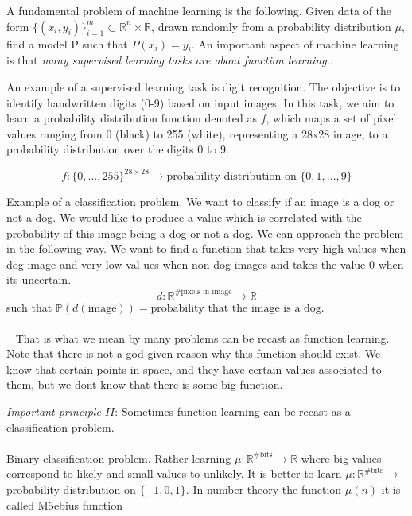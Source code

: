 \documentclass[../main.tex]{subfiles}
\begin{document}
	\noindent 
	A fundamental problem of machine learning is the following. Given data of the form $\{(x_i,y_i)\}^m_{i=1} \subset \mathbb{R}^n \times \mathbb{R}$, drawn randomly from a probability distribution $\mu$, find a model P such that $P(x_i)=y_i$. An important aspect of machine learning is that \textit{many supervised learning tasks are about function learning.}. 
\begin{xmpl}
	\noindent An example of a supervised learning task is digit recognition. The objective is to identify handwritten digits (0-9) based on input images. In this task, we aim to learn a probability distribution function denoted as $f$, which maps a set of pixel values ranging from 0 (black) to 255 (white), representing a 28x28 image, to a probability distribution over the digits 0 to 9.

$$f: \{0,..., 255\}^{28 \times 28} \longrightarrow \text{probability distribution on } \{0,1,...,9\}$$

\end{xmpl}
\begin{xmpl} Example of a classification problem. We want to classify if an image is a dog or not a dog. We would like to produce a value which is correlated with the probability of this image being a dog or not a dog.  We can approach the problem in the following way. We want to find a function that takes very high values when dog-image and very low val ues when non dog images and takes the value 0 when its uncertain. 
	$$d: \mathbb{R}^{\# \text{pixels in image}} \rightarrow \mathbb{R} $$
	such that $\mathbb{P}(d(\text{image})) = \text{probability that the image is a dog.}$ \\ \\  
	That is what we mean by many problems can be recast as function learning. Note that there is not a god-given reason why this function should exist. We know that certain points in space, and they have certain values associated to them, but we dont know that there is some big function. 
\end{xmpl}

\noindent \textit{Important principle $II$}: Sometimes function learning can be recast as a classification problem.  
\\ \\ 
Binary classification problem. 
Rather learning $\mu : \mathbb{R}^{\# \text{bits}} \rightarrow \mathbb{R}$ where big values correspond to likely and small values to unlikely. It is better to learn $\mu : \mathbb{R}^{\# \text{bits}} \rightarrow $ probability distribution on $\{-1,0,1\}$. In number theory the function $\mu(n)$ it is called Möebius function 
\end{document}
